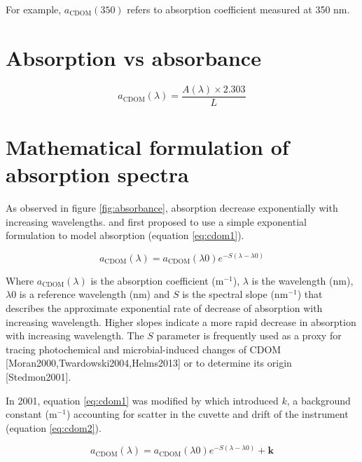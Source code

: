 \documentclass[]{book}
\begin{document}
For example, \(a_{\text{CDOM}}(350)\) refers to absorption coefficient
measured at 350 nm.

\section{Absorption vs absorbance}\label{absorption-vs-absorbance}

\begin{equation}
a_{\text{CDOM}}(\lambda) = \frac{A(\lambda) \times 2.303}{L}
\label{eq:absorption}
\end{equation}

\section{Mathematical formulation of absorption
spectra}\label{mathematical-formulation-of-absorption-spectra}

As observed in figure \ref{fig:absorbance}, absorption decrease
exponentially with increasing wavelengths. \citet{Jerlov1968} and
\citet{Bricaud1981} first proposed to use a simple exponential
formulation to model absorption (equation \ref{eq:cdom1}).

\begin{equation}
a_{\text{CDOM}}(\lambda) = a_{\text{CDOM}}(\lambda0)e^{-S(\lambda - \lambda0)}
\label{eq:cdom1}
\end{equation}

Where \(a_{\text{CDOM}}(\lambda)\) is the absorption coefficient
(m\(^{-1}\)), \(\lambda\) is the wavelength (nm), \(\lambda0\) is a
reference wavelength (nm) and \(S\) is the spectral slope (nm\(^{-1}\))
that describes the approximate exponential rate of decrease of
absorption with increasing wavelength. Higher slopes indicate a more
rapid decrease in absorption with increasing wavelength. The \(S\)
parameter is frequently used as a proxy for tracing photochemical and
microbial-induced changes of CDOM
{[}Moran2000,Twardowski2004,Helms2013{]} or to determine its origin
{[}Stedmon2001{]}.

In 2001, equation \ref{eq:cdom1} was modified by \citet{Stedmon2001}
which introduced \(k\), a background constant (m\(^{-1}\)) accounting
for scatter in the cuvette and drift of the instrument (equation
\ref{eq:cdom2}).

\begin{equation}
a_{\text{CDOM}}(\lambda) = a_{\text{CDOM}}(\lambda0)e^{-S(\lambda - \lambda0)} + \mathbf{k}
\label{eq:cdom2}
\end{equation}
\end{document}

